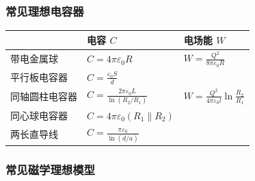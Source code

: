 \documentclass[UTF8,fontset=fandol,zihao=5]{ctexart}
\begin{document}
\subsubsection{常见理想电容器}

\begin{center}
\begin{tabularx}{0.96\textwidth}{>{\raggedright\arraybackslash}p{3.8cm}X X}
\toprule
  & 电容 \(C\) & 电场能 \(W\)\\
\midrule
带电金属球 & \(\displaystyle C=4\pi\varepsilon_0 R\) & \(\displaystyle W=\frac{Q^2}{8\pi\varepsilon_0R}\)\\
平行板电容器 & \(\displaystyle C=\frac{\varepsilon_0S}{d}\) & \\
同轴圆柱电容器 & \(\displaystyle C=\frac{2\pi\varepsilon_0L}{\ln(R_2/R_1)}\) & \(\displaystyle W=\frac{Q^2}{4\pi\varepsilon_0l}\ln\frac{R_2}{R_1}\)\\
同心球电容器 & \(C=4\pi\varepsilon_0(R_1\parallel R_2)\) & \\
两长直导线 & \(\displaystyle C=\frac{\pi\varepsilon_0}{\ln(d/a)}\) & \\
\bottomrule
\end{tabularx}
\end{center}


\subsubsection{常见磁学理想模型}
\end{document}

